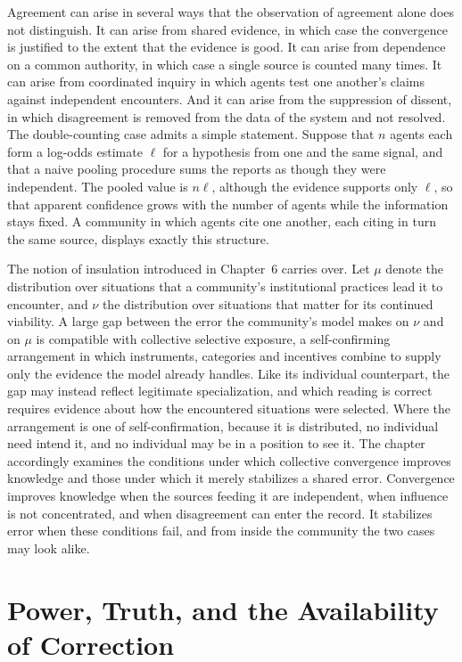 Agreement can arise in several ways that the observation of agreement alone does not distinguish. It can arise from shared evidence, in which case the convergence is justified to the extent that the evidence is good. It can arise from dependence on a common authority, in which case a single source is counted many times. It can arise from coordinated inquiry in which agents test one another's claims against independent encounters. And it can arise from the suppression of dissent, in which disagreement is removed from the data of the system and not resolved. The double-counting case admits a simple statement. Suppose that $n$ agents each form a log-odds estimate $\ell$ for a hypothesis from one and the same signal, and that a naive pooling procedure sums the reports as though they were independent. The pooled value is $n\ell$, although the evidence supports only $\ell$, so that apparent confidence grows with the number of agents while the information stays fixed. A community in which agents cite one another, each citing in turn the same source, displays exactly this structure.

The notion of insulation introduced in Chapter~6 carries over. Let $\mu$ denote the distribution over situations that a community's institutional practices lead it to encounter, and $\nu$ the distribution over situations that matter for its continued viability. A large gap between the error the community's model makes on $\nu$ and on $\mu$ is compatible with collective selective exposure, a self-confirming arrangement in which instruments, categories and incentives combine to supply only the evidence the model already handles. Like its individual counterpart, the gap may instead reflect legitimate specialization, and which reading is correct requires evidence about how the encountered situations were selected. Where the arrangement is one of self-confirmation, because it is distributed, no individual need intend it, and no individual may be in a position to see it. The chapter accordingly examines the conditions under which collective convergence improves knowledge and those under which it merely stabilizes a shared error. Convergence improves knowledge when the sources feeding it are independent, when influence is not concentrated, and when disagreement can enter the record. It stabilizes error when these conditions fail, and from inside the community the two cases may look alike.

\chapter{Power, Truth, and the Availability of Correction}

